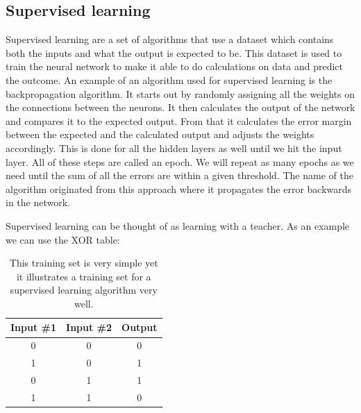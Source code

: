 \subsection{Supervised learning}
Supervised learning are a set of algorithms that use a dataset which contains both the inputs and what the output is expected to be. This dataset is used to train the neural network to make it able to do calculations on data and predict the outcome. An example of an algorithm used for supervised learning is the backpropagation algorithm. 
It starts out by randomly assigning all the weights on the connections between the neurons. It then calculates the output of the network and compares it to the expected output. From that it calculates the error margin between the expected and the calculated output and adjusts the weights accordingly. This is done for all the hidden layers as well until we hit the input layer. All of these steps are called an epoch. We will repeat as many epochs as we need until the sum of all the errors are within a given threshold. The name of the algorithm originated from this approach where it propagates the error backwards in the network.

Supervised learning can be thought of as learning with a teacher. As an example we can use the XOR table:

\begin{table}[h!]
\centering  %
\begin{tabular}{c c c} %
Input \#1 & Input \#2 & Output \\ [0.5ex] %
\hline                  %
0 & 0 & 0  \\ %
1 & 0 & 1  \\
0 & 1 & 1  \\
1 & 1 & 0 \\ [1ex] %
\hline %
\end{tabular}
\caption{This training set is very simple yet it illustrates a training set for a supervised learning algorithm very well.} %
\label{table:xor-table} %
\end{table}

